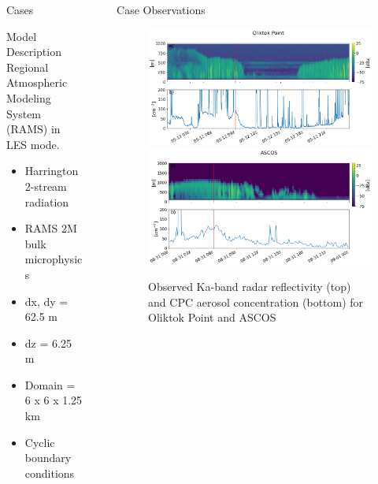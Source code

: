 \documentclass[final]{beamer}
\newlength{\sepwid}
\newlength{\onecolwid}
\newlength{\twocolwid}
\begin{document}
\begin{frame}[t]
\begin{columns}[t]
\begin{column}{\onecolwid}
\begin{block}{Cases}
\end{block}
\begin{block}{Model Description}
	Regional Atmospheric Modeling System (RAMS) in LES mode. 

	\begin{itemize}
		\item Harrington 2-stream radiation
		\item RAMS 2M bulk microphysics
		\item dx, dy = 62.5 m
		\item dz = 6.25 m
		\item Domain = 6 x 6 x 1.25 km
		\item Cyclic boundary conditions
	\end{itemize}
\end{block}



\end{column} %

\begin{column}{\sepwid}\end{column} %

\begin{column}{\twocolwid}
		\begin{block}{Case Observations}
			\begin{figure}
				\centering
				\includegraphics[width=0.49\linewidth]{images/oli_timeseries.png}
				\includegraphics[width=0.49\linewidth]{images/ascos_timeseries.png}
				\caption{Observed Ka-band radar reflectivity (top) and CPC aerosol concentration (bottom) for Oliktok Point and ASCOS}\label{fig:obs}
			\end{figure}	
		\end{block}


\end{column}
\end{columns}
\end{frame}
\end{document}
